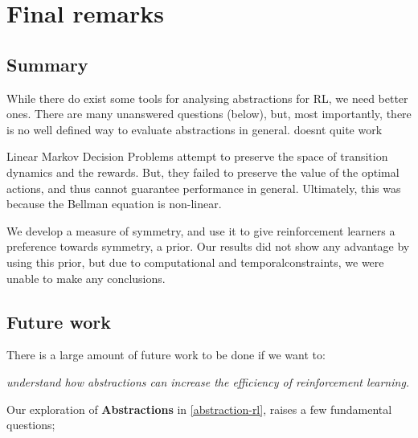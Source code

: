 \chapter{Final remarks}\label{C:con}

\section{Summary}

While there do exist some tools for analysing abstractions for RL, we need better ones.
There are many unanswered questions (below), but, most importantly,
there is no well defined way to evaluate abstractions in general. {\color{red} doesnt quite work}

Linear Markov Decision Problems attempt to preserve the space of transition dynamics and the rewards.
But, they failed to preserve the value of the optimal actions, and thus cannot
guarantee performance in general. Ultimately, this was because the Bellman equation is non-linear.

We develop a measure of symmetry, and use it to give reinforcement learners a preference towards symmetry, a prior.
Our results did not show any advantage by using this prior, but due to computational and temporal\footnotemark constraints,
we were unable to make any conclusions.


\newpage
\section{Future work}

There is a large amount of future work to be done if we want to:

\begin{displayquote}
\textit{understand how abstractions can increase the efficiency of reinforcement learning.}
\end{displayquote}

Our exploration of \textbf{Abstractions} in \ref{abstraction-rl}, raises a few fundamental questions;


